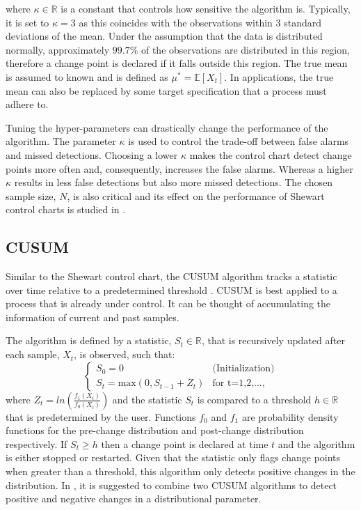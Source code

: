 where $\kappa \in \mathbb{R}$ is a constant that controls how sensitive the algorithm is. Typically, it is set to $\kappa=3$ as this coincides with the observations within $3$ standard deviations of the mean. Under the assumption that the data is distributed normally,  approximately $99.7\%$ of the observations are distributed in this region, therefore a change point is declared if it falls outside this region. The true mean is assumed to known and is defined as $\mu^* = \mathbb{E}[X_t]$. In applications, the true mean can also be replaced by some target specification that a process must adhere to.

Tuning the hyper-parameters can drastically change the performance of the algorithm. The parameter $\kappa$ is used to control the trade-off between false alarms and missed detections. Choosing a lower $\kappa$ makes the control chart detect change points more often and, consequently, increases the false alarms. Whereas a higher $\kappa$ results in less false detections but also more missed detections. The chosen sample size, $N$, is also critical and its effect on the performance of Shewart control charts is studied in \cite{haridy2017effect}.

\subsection{CUSUM}
\label{cusum}
Similar to the Shewart control chart, the CUSUM algorithm tracks a statistic over time relative to a predetermined threshold \cite{page1954continuous}. CUSUM is best applied to a process that is already under control. It can be thought of accumulating the information of current and past samples. 

The algorithm is defined by a statistic, $S_t \in \mathbb{R}$, that is recursively updated after each sample, $X_t$, is observed, such that:
\begin{equation}
  \begin{cases}
    S_0 = 0  & \text{(Initialization)} \\
    S_t = \text{max}(0, S_{t-1} + Z_t) & \text{for t=1,2,...,}
  \end{cases}
\end{equation}
where $Z_t=ln(\frac{f_{1}(X_i)}{f_{0}(X_i)})$ and the statistic $S_t$ is compared to a threshold $h \in \mathbb{R}$ that is predetermined by the user. Functions $f_0$ and $f_1$ are probability density functions for the pre-change distribution and post-change distribution respectively.  If $S_t \geq h$ then a change point is declared at time $t$ and the algorithm is either stopped or restarted. Given that the statistic only flags change points when greater than a threshold, this algorithm only detects positive changes in the distribution. In \cite{page1954continuous}, it is suggested to combine two CUSUM algorithms to detect positive and negative changes in a distributional parameter.

